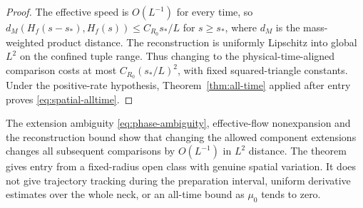 \begin{proof}
The effective speed is $O(L^{-1})$ for every time, so
$d_M(H_f(s-s_*),H_f(s))\le C_{R_0}s_*/L$ for $s\ge s_*$,
where $d_M$ is the mass-weighted product distance. The reconstruction
is uniformly Lipschitz into global $L^2$ on the confined tuple range.
Thus changing to the physical-time-aligned comparison costs at most
$C_{R_0}(s_*/L)^2$, with fixed squared-triangle constants. Under the
positive-rate hypothesis, Theorem~\ref{thm:all-time} applied after
entry proves \eqref{eq:spatial-alltime}.
\end{proof}

The extension ambiguity \eqref{eq:phase-ambiguity}, effective-flow nonexpansion
and the reconstruction bound show that changing the allowed component
extensions changes all subsequent comparisons by $O(L^{-1})$ in
$L^2$ distance. The theorem gives entry from a fixed-radius open class
with genuine spatial variation. It does not give trajectory tracking
during the preparation interval, uniform derivative estimates over
the whole neck, or an all-time bound as $\mu_0$ tends to zero.
